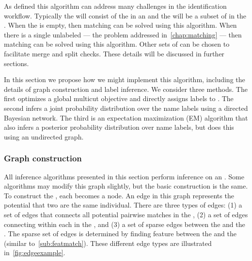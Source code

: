         As defined this algorithm can address many challenges in the
          identification workflow.
        Typically the \uset{} will consist of the \annots{} in an
          \occurrence{} and the \lset{} will be a subset of \exemplars{} in the
          \masterdatabase{}.
        When the \masterdatabase{} is empty, then \intraoccurrence{} matching
          can be solved using this algorithm.
        When there is a single unlabeled \annot{} --- the problem addressed
          in~\cref{chap:matching} --- then \vsexemplar{} matching can be solved
          using this algorithm.
        Other sets of \annots{} can be chosen to facilitate merge and split
          checks.
        These details will be discussed in further sections.

        In this section we propose how we might implement this algorithm,
          including the details of graph construction and label inference.
        We consider three methods.
        The first optimizes a global multicut objective and directly assigns
          labels to \annots{}.
        The second infers a joint probability distribution over the name
          labels using a directed Bayesian network.
        The third is an expectation maximization (EM) algorithm that also
          infers a posterior probability distribution over name labels, but does
          this using an undirected graph.

        \subsubsection{Graph construction}

            All inference algorithms presented in this section perform
              inference on an \glossterm{\idengraph{}}.
            Some algorithms may modify this graph slightly, but the basic
              construction is the same.
            To construct the \idengraph{}, each \annot{} becomes a node.
            An edge in this graph represents the potential that two \annots{}
              are the same individual.
            There are three types of edges:
            (1) a set of edges that connects all potential pairwise matches in
              the \uset{},
            (2) a set of edges connecting \annots{} within each \name{} in the
              \lset{}, and %
            (3) a set of sparse edges between the \uset{} and the \lset{}.
            The sparse set of edges is determined by finding feature
              \correspondences{} between the \uset{} and the \lset{} (similar
              to~\cref{sub:featmatch}).
            These different edge types are illustrated
              in~\cref{fig:edgeexample}.

